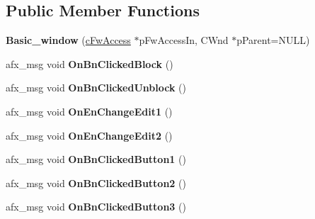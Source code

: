 \subsection*{Public Member Functions}
\begin{DoxyCompactItemize}
\item 
\hypertarget{class_basic__window_ae4b70715ce8e59b6a6b94c4753e25fbb}{}{\bfseries Basic\+\_\+window} (\hyperlink{classc_fw_access}{c\+Fw\+Access} $\ast$p\+Fw\+Access\+In, C\+Wnd $\ast$p\+Parent=N\+U\+L\+L)\label{class_basic__window_ae4b70715ce8e59b6a6b94c4753e25fbb}

\item 
\hypertarget{class_basic__window_ab1979f288ca0de48bc348d8d37450467}{}afx\+\_\+msg void {\bfseries On\+Bn\+Clicked\+Block} ()\label{class_basic__window_ab1979f288ca0de48bc348d8d37450467}

\item 
\hypertarget{class_basic__window_a5fe3e664c30e5263f2df87fe60fc67ff}{}afx\+\_\+msg void {\bfseries On\+Bn\+Clicked\+Unblock} ()\label{class_basic__window_a5fe3e664c30e5263f2df87fe60fc67ff}

\item 
\hypertarget{class_basic__window_a500da75c42b6515cee14403cee29d4ff}{}afx\+\_\+msg void {\bfseries On\+En\+Change\+Edit1} ()\label{class_basic__window_a500da75c42b6515cee14403cee29d4ff}

\item 
\hypertarget{class_basic__window_a0565f352a1ecb13d6460288ac4f5af9e}{}afx\+\_\+msg void {\bfseries On\+En\+Change\+Edit2} ()\label{class_basic__window_a0565f352a1ecb13d6460288ac4f5af9e}

\item 
\hypertarget{class_basic__window_a362554cba60f4105745f10eedcf31005}{}afx\+\_\+msg void {\bfseries On\+Bn\+Clicked\+Button1} ()\label{class_basic__window_a362554cba60f4105745f10eedcf31005}

\item 
\hypertarget{class_basic__window_aa7e927a5635aee90f6732b6a2a286b31}{}afx\+\_\+msg void {\bfseries On\+Bn\+Clicked\+Button2} ()\label{class_basic__window_aa7e927a5635aee90f6732b6a2a286b31}

\item 
\hypertarget{class_basic__window_aee2e80f482c4ff694fe316a2e7af28e5}{}afx\+\_\+msg void {\bfseries On\+Bn\+Clicked\+Button3} ()\label{class_basic__window_aee2e80f482c4ff694fe316a2e7af28e5}

\end{DoxyCompactItemize}
